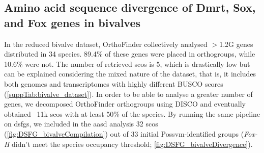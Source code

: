 \subsection{Amino acid sequence divergence of Dmrt, Sox, and Fox genes in bivalves}
In the reduced bivalve dataset, OrthoFinder collectively analysed $>$1.2G genes distributed in 34 species. 89.4\% of these genes were placed in orthogroups, while 10.6\% were not. The number of retrieved \glspl{sco} is 5, which is drastically low but can be explained considering the mixed nature of the dataset, that is, it includes both genomes and transcriptomes with highly different BUSCO scores (\cref{suppTab:bivalve_dataset}). In order to be able to analyse a greater number of genes, we decomposed OrthoFinder orthogroups using DISCO and eventually obtained ~11k \glspl{sco} with at least 50\% of the species. By running the same pipeline on \glspl{dsfg}, we included in the \gls{aasd} analysis 32 \glspl{sco} (\cref{fig:DSFG_bivalveCompilation}) out of 33 initial Possvm-identified groups (\textit{Fox-H} didn’t meet the species occupancy threshold; \cref{fig:DSFG_bivalveDivergence}).

